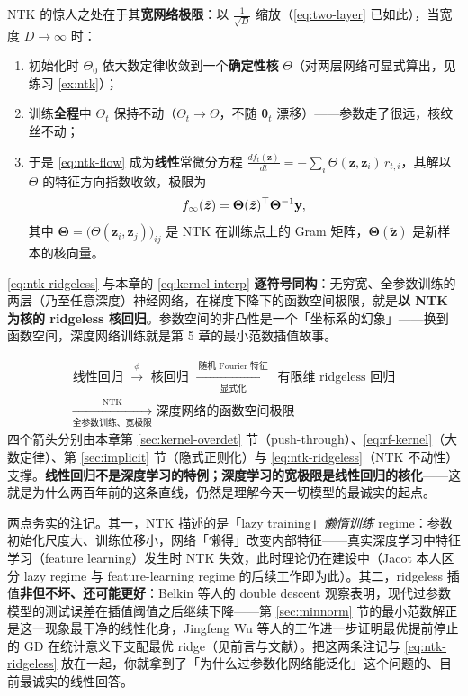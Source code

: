 NTK 的惊人之处在于其\textbf{宽网络极限}：以 $\tfrac{1}{\sqrt{D}}$ 缩放（\eqref{eq:two-layer} 已如此），当宽度 $D \to \infty$ 时：

\begin{enumerate}[label=(\arabic*)]
  \item 初始化时 $\Theta_0$ 依大数定律收敛到一个\textbf{确定性核} $\Theta$（对两层网络可显式算出，见练习 \ref{ex:ntk}）；
  \item 训练\textbf{全程}中 $\Theta_t$ 保持不动（$\Theta_t \to \Theta$，不随 $\bm{\theta}_t$ 漂移）——参数走了很远，核纹丝不动；
  \item 于是 \eqref{eq:ntk-flow} 成为\textbf{线性}常微分方程 $\frac{df_t(\bm{z})}{dt} = -\sum_i \Theta(\bm{z},\bm{z}_i)\, r_{t,i}$，其解以 $\Theta$ 的特征方向指数收敛，极限为
  \begin{equation}\label{eq:ntk-ridgeless}
    f_\infty(\tilde{\bm{z}}) = \bm{\Theta}(\tilde{\bm{z}})^\top \bm{\Theta}^{-1} \mathbf{y},
  \end{equation}
  其中 $\bm{\Theta} = \big(\Theta(\bm{z}_i,\bm{z}_j)\big)_{ij}$ 是 NTK 在训练点上的 Gram 矩阵，$\bm{\Theta}(\tilde{\bm{z}})$ 是新样本的核向量。
\end{enumerate}

\eqref{eq:ntk-ridgeless} 与本章的 \eqref{eq:kernel-interp} \textbf{逐符号同构}：无穷宽、全参数训练的两层（乃至任意深度\cite{lee2019}）神经网络，在梯度下降下的函数空间极限，就是\textbf{以 NTK 为核的 ridgeless 核回归}。参数空间的非凸性是一个「坐标系的幻象」——换到函数空间，深度网络训练就是第 5 章的最小范数插值故事。

\begin{keybox}[从一条直线到深度网络的桥]
\[
\begin{gathered}
\text{线性回归 } \xrightarrow{\ \phi\ } \text{ 核回归 } \xrightarrow[\text{显式化}]{\ \text{随机 Fourier 特征}\ } \text{ 有限维 ridgeless 回归} \\
\xrightarrow[\text{全参数训练、宽极限}]{\ \mathrm{NTK}\ } \text{ 深度网络的函数空间极限}
\end{gathered}
\]
四个箭头分别由本章第 \ref{sec:kernel-overdet} 节（push-through）、\eqref{eq:rf-kernel}（大数定律）、第 \ref{sec:implicit} 节（隐式正则化）与 \eqref{eq:ntk-ridgeless}（NTK 不动性）支撑。\textbf{线性回归不是深度学习的特例；深度学习的宽极限是线性回归的核化}——这就是为什么两百年前的这条直线，仍然是理解今天一切模型的最诚实的起点。
\end{keybox}

两点务实的注记。其一，NTK 描述的是「lazy training」\textit{懒惰训练} regime：参数初始化尺度大、训练位移小，网络「懒得」改变内部特征——真实深度学习中特征学习（feature learning）发生时 NTK 失效，此时理论仍在建设中（Jacot 本人区分 lazy regime 与 feature-learning regime 的后续工作即为此）。其二，ridgeless 插值\textbf{非但不坏、还可能更好}：Belkin 等人的 double descent 观察表明，现代过参数模型的测试误差在插值阈值之后继续下降\cite{belkin2019}——第 \ref{sec:minnorm} 节的最小范数解正是这一现象最干净的线性化身，Jingfeng Wu 等人的工作进一步证明最优提前停止的 GD 在统计意义下支配最优 ridge（见前言与文献）\cite{wu2025}。把这两条注记与 \eqref{eq:ntk-ridgeless} 放在一起，你就拿到了「为什么过参数化网络能泛化」这个问题的、目前最诚实的线性回答。

